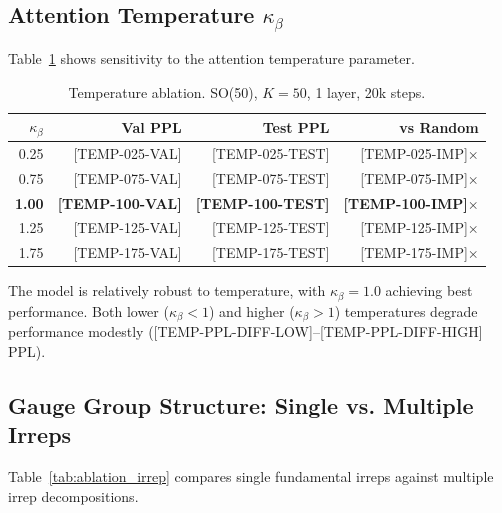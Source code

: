 \documentclass[twoside,11pt]{article}
\begin{document}
\subsection{Attention Temperature $\kappa_\beta$}

Table~\ref{tab:ablation_temp} shows sensitivity to the attention temperature parameter.

\begin{table}[h]
\centering
\small
\caption{Temperature ablation. SO(50), $K=50$, 1 layer, 20k steps.}
\label{tab:ablation_temp}
\begin{tabular}{rrrr}
\toprule
\textbf{$\kappa_\beta$} & \textbf{Val PPL} & \textbf{Test PPL} & \textbf{vs Random} \\
\midrule
0.25 & [TEMP-025-VAL] & [TEMP-025-TEST] & [TEMP-025-IMP]$\times$ \\
0.75 & [TEMP-075-VAL] & [TEMP-075-TEST] & [TEMP-075-IMP]$\times$ \\
\textbf{1.00} & \textbf{[TEMP-100-VAL]} & \textbf{[TEMP-100-TEST]} & \textbf{[TEMP-100-IMP]$\times$} \\
1.25 & [TEMP-125-VAL] & [TEMP-125-TEST] & [TEMP-125-IMP]$\times$ \\
1.75 & [TEMP-175-VAL] & [TEMP-175-TEST] & [TEMP-175-IMP]$\times$ \\
\bottomrule
\end{tabular}
\end{table}

The model is relatively robust to temperature, with $\kappa_\beta = 1.0$ achieving best performance. Both lower ($\kappa_\beta < 1$) and higher ($\kappa_\beta > 1$) temperatures degrade performance modestly ([TEMP-PPL-DIFF-LOW]--[TEMP-PPL-DIFF-HIGH] PPL).

\subsection{Gauge Group Structure: Single vs. Multiple Irreps}
\label{sec:multi_irrep}

Table~\ref{tab:ablation_irrep} compares single fundamental irreps against multiple irrep decompositions.
\end{document}
